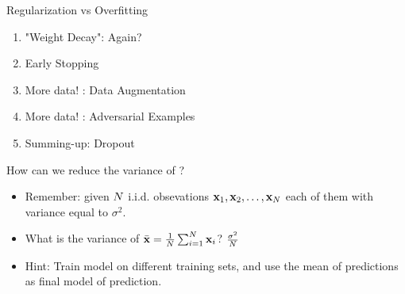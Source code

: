 \documentclass[handout,xcolor=pdftex,dvipsnames,table,mathserif]{beamer}
\begin{document}
\begin{frame}{Regularization vs Overfitting}
\begin{enumerate}
\item "Weight Decay": Again?
\item Early Stopping
\item More data! : Data Augmentation
\item More data!  : Adversarial Examples
\item Summing-up: Dropout
\end{enumerate}
\end{frame}

\begin{frame}{How can we reduce the variance of ?}
\begin{itemize}
\item Remember: given $N$ i.i.d. obsevations $\mathbf{x}_1,\mathbf{x}_2,\ldots,\mathbf{x}_N$ each of them with variance equal to $\sigma^2$. 
\item What is the variance of $\bar{\mathbf{x}}=\frac{1}{N} \sum_{i=1}^{N} \mathbf{x}_i $? \pause $\frac{\sigma^2}{N}$
\item \alert{Hint}: Train model on different training sets, and use the mean of predictions as final model of prediction.
\end{itemize}
\end{frame}
\end{document}
